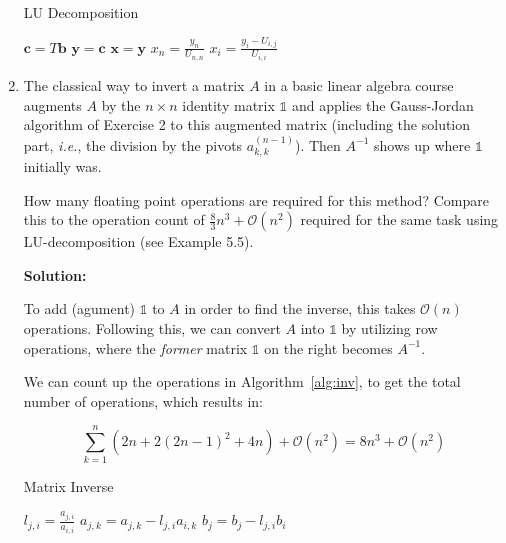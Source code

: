\documentclass[12pt]{article}
\newcommand{\BigO}[1]{\mathcal{O}\left( #1 \right)}
\newcommand{\Id}{\mathbb{1}}
\begin{document}
\begin{enumerate}
\begin{algorithm}[H]
\caption{LU Decomposition}
\begin{algorithmic}[1]
\STATE $\mathbf{c} = T\mathbf{b}$
\STATE $\mathbf{y} = \mathbf{c}$
    \ENDFOR
\ENDFOR
{}
\STATE $\mathbf{x} = \mathbf{y}$
\STATE $x_{n} = \frac{y_{n}}{U_{n,n}}$
      \STATE $x_{i} = \frac{y_{i} - U_{i,j}}{U_{i,i}}$
    \ENDFOR
\ENDFOR
{}
\end{algorithmic}
\end{algorithm}

\item The classical way to invert a matrix $A$ in a basic linear algebra course augments $A$ by the $n\times n$
identity matrix $\Id$ and applies the Gauss-Jordan algorithm of Exercise 2 to this augmented matrix
(including the solution part, {\em i.e.}, the division by the pivots $a_{k,k}^{(n-1)}$). Then $A^{-1}$
shows up where $\Id$ initially was.

How many floating point operations are required for this method? Compare this to the operation count of
$\frac{8}{3}n^{3} + \BigO{n^{2}}$ required for the same task using LU-decomposition (see Example 5.5).

{\bf Solution:}

To add (agument) $\Id$ to $A$ in order to find the inverse, this takes $\BigO{n}$ operations.
Following this, we can convert $A$ into $\Id$ by utilizing row operations, where the {\em former}
matrix $\Id$ on the right becomes $A^{-1}$.

We can count up the operations in Algorithm~\ref{alg:inv}, to get the total number of operations,
which results in:

\[
\sum_{k=1}^{n} \left(2n + 2(2n-1)^{2} + 4n\right) + \BigO{n^{2}} = 8n^{3} + \BigO{n^{2}}
\]


\begin{algorithm}[H]
\caption{Matrix Inverse}
\begin{algorithmic}[1]
      \STATE $l_{j,i} = \frac{a_{j,i}}{a_{i,i}}$
              \STATE $a_{j,k} = a_{j,k} - l_{j,i}a_{i,k}$
          \ENDIF
      \ENDFOR
      \STATE $b_{j} = b_{j} - l_{j,i}b_{i}$
    \ENDFOR
\ENDFOR
{}
  \ENDFOR
\ENDFOR
\COMMENT{Converting the left matrix to $\Id$}
\end{algorithmic}
\label{alg:inv}
\end{algorithm}


\end{enumerate}
\end{document}
